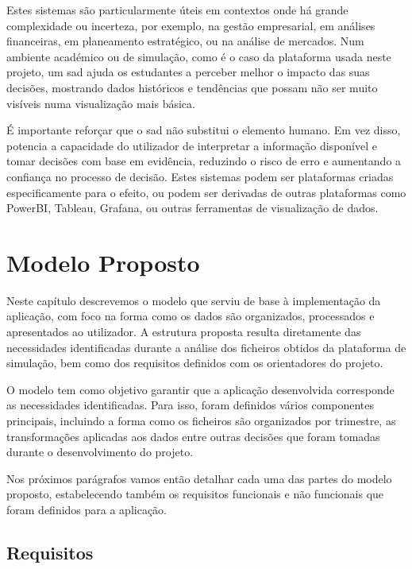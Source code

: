Estes sistemas são particularmente úteis em contextos onde há grande complexidade ou incerteza, por exemplo, na gestão empresarial, em análises financeiras, em planeamento estratégico, ou na análise de mercados. Num ambiente académico ou de simulação, como é o caso da plataforma usada neste projeto, um \gls{sad} ajuda os estudantes a perceber melhor o impacto das suas decisões, mostrando dados históricos e tendências que possam não ser muito visíveis numa visualização mais básica.

É importante reforçar que o \gls{sad} não substitui o elemento humano. Em vez disso, potencia a capacidade do utilizador de interpretar a informação disponível e tomar decisões com base em evidência, reduzindo o risco de erro e aumentando a confiança no processo de decisão. Estes sistemas podem ser plataformas criadas especificamente para o efeito, ou podem ser derivadas de outras plataformas como PowerBI, Tableau, Grafana, ou outras ferramentas de visualização de dados.

\chapter{Modelo Proposto}
\label{ch:modeloProposto}

Neste capítulo descrevemos o modelo que serviu de base à implementação da aplicação, com foco na forma como os dados são organizados, processados e apresentados ao utilizador. A estrutura proposta resulta diretamente das necessidades identificadas durante a análise dos ficheiros obtidos da plataforma de simulação, bem como dos requisitos definidos com os orientadores do projeto.

O modelo tem como objetivo garantir que a aplicação desenvolvida corresponde as necessidades identificadas. Para isso, foram definidos vários componentes principais, incluindo a forma como os ficheiros são organizados por trimestre, as transformações aplicadas aos dados entre outras decisões que foram tomadas durante o desenvolvimento do projeto.

Nos próximos parágrafos vamos então detalhar cada uma das partes do modelo proposto, estabelecendo também os requisitos funcionais e não funcionais que foram definidos para a aplicação.

\section{Requisitos}
\label{sec:requisitos}

